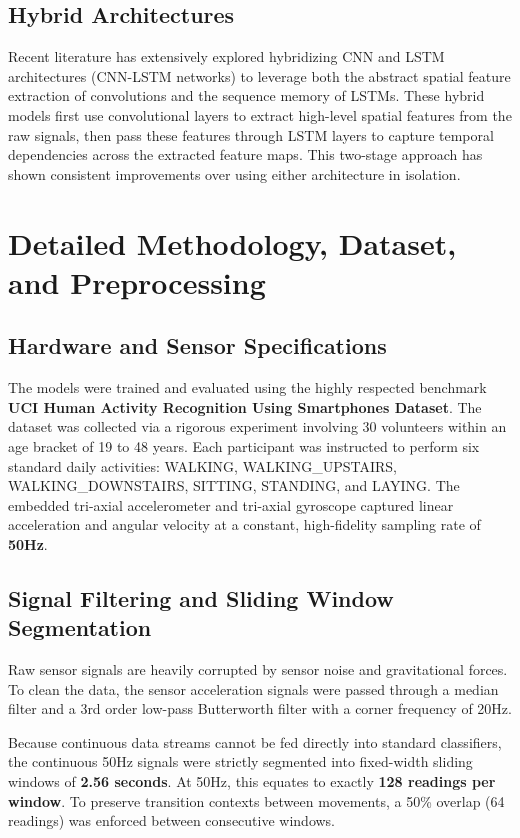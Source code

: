 \documentclass[12pt,a4paper]{article}
\begin{document}
\subsection{Hybrid Architectures}
Recent literature has extensively explored hybridizing CNN and LSTM architectures (CNN-LSTM networks) to leverage both the abstract spatial feature extraction of convolutions and the sequence memory of LSTMs. These hybrid models first use convolutional layers to extract high-level spatial features from the raw signals, then pass these features through LSTM layers to capture temporal dependencies across the extracted feature maps. This two-stage approach has shown consistent improvements over using either architecture in isolation.

\newpage
\section{Detailed Methodology, Dataset, and Preprocessing}
\subsection{Hardware and Sensor Specifications}
The models were trained and evaluated using the highly respected benchmark \textbf{UCI Human Activity Recognition Using Smartphones Dataset}. The dataset was collected via a rigorous experiment involving 30 volunteers within an age bracket of 19 to 48 years. Each participant was instructed to perform six standard daily activities: WALKING, WALKING\_UPSTAIRS, WALKING\_DOWNSTAIRS, SITTING, STANDING, and LAYING. The embedded tri-axial accelerometer and tri-axial gyroscope captured linear acceleration and angular velocity at a constant, high-fidelity sampling rate of \textbf{50Hz}.

\subsection{Signal Filtering and Sliding Window Segmentation}
Raw sensor signals are heavily corrupted by sensor noise and gravitational forces. To clean the data, the sensor acceleration signals were passed through a median filter and a 3rd order low-pass Butterworth filter with a corner frequency of 20Hz. 

Because continuous data streams cannot be fed directly into standard classifiers, the continuous 50Hz signals were strictly segmented into fixed-width sliding windows of \textbf{2.56 seconds}. At 50Hz, this equates to exactly \textbf{128 readings per window}. To preserve transition contexts between movements, a 50\% overlap (64 readings) was enforced between consecutive windows.
\end{document}
